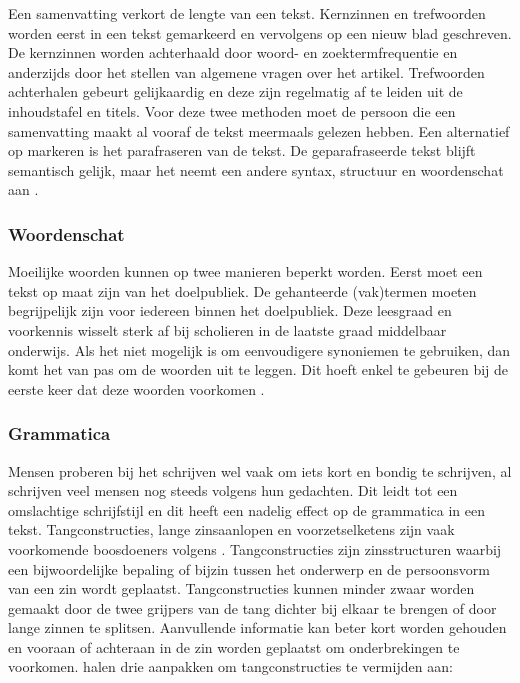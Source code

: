 Een samenvatting verkort de lengte van een tekst. Kernzinnen en trefwoorden worden eerst in een tekst gemarkeerd en vervolgens op een nieuw blad geschreven. De kernzinnen worden achterhaald door woord- en zoektermfrequentie en anderzijds door het stellen van algemene vragen over het artikel. Trefwoorden achterhalen gebeurt gelijkaardig en deze zijn regelmatig af te leiden uit de inhoudstafel en titels. Voor deze twee methoden moet de persoon die een samenvatting maakt al vooraf de tekst meermaals gelezen hebben. Een alternatief op markeren is het parafraseren van de tekst. De geparafraseerde tekst blijft semantisch gelijk, maar het neemt een andere syntax, structuur en woordenschat aan \autocite{Rijkhoff2022}.

\subsubsection{Woordenschat}

Moeilijke woorden kunnen op twee manieren beperkt worden. Eerst moet een tekst op maat zijn van het doelpubliek. De gehanteerde (vak)termen moeten begrijpelijk zijn voor iedereen binnen het doelpubliek. Deze leesgraad en voorkennis wisselt sterk af bij scholieren in de laatste graad middelbaar onderwijs. Als het niet mogelijk is om eenvoudigere synoniemen te gebruiken, dan komt het van pas om de woorden uit te leggen. Dit hoeft enkel te gebeuren bij de eerste keer dat deze woorden voorkomen \autocite{Bosmans2022a, Bosmans2022b}.


\subsubsection{Grammatica}

Mensen proberen bij het schrijven wel vaak om iets kort en bondig te schrijven, al schrijven veel mensen nog steeds volgens hun gedachten. Dit leidt tot een omslachtige schrijfstijl en dit heeft een nadelig effect op de grammatica in een tekst. Tangconstructies, lange zinsaanlopen en voorzetselketens zijn vaak voorkomende boosdoeners volgens \textcite{Bosmans2022c}. Tangconstructies zijn zinsstructuren waarbij een bijwoordelijke bepaling of bijzin tussen het onderwerp en de persoonsvorm van een zin wordt geplaatst. Tangconstructies kunnen minder zwaar worden gemaakt door de twee grijpers van de tang dichter bij elkaar te brengen of door lange zinnen te splitsen. Aanvullende informatie kan beter kort worden gehouden en vooraan of achteraan in de zin worden geplaatst om onderbrekingen te voorkomen. \textcite{Rijnvis2020, Bosmans2022c} halen drie aanpakken om tangconstructies te vermijden aan:

